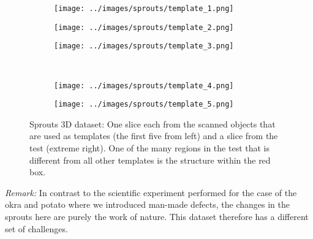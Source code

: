 \documentclass[journal]{IEEEtran}
\begin{document}
\begin{figure}[!h]
    \begin{subfigure}[b]{0.3\linewidth}
        \texttt{[image: ../images/sprouts/template\_1.png]}
\captionsetup{labelformat=empty}
        \caption{}
    \end{subfigure}
\quad
    \begin{subfigure}[b]{0.3\linewidth}
        \texttt{[image: ../images/sprouts/template\_2.png]}
\captionsetup{labelformat=empty}
        \caption{}
     \end{subfigure}
\quad
    \begin{subfigure}[b]{0.3\linewidth}
        \texttt{[image: ../images/sprouts/template\_3.png]}
\captionsetup{labelformat=empty}
        \caption{}
     \end{subfigure}\\
    \begin{subfigure}[b]{0.3\linewidth}
        \texttt{[image: ../images/sprouts/template\_4.png]}
\captionsetup{labelformat=empty}
        \caption{}
     \end{subfigure}
\quad
    \begin{subfigure}[b]{0.3\linewidth}
        \texttt{[image: ../images/sprouts/template\_5.png]}
\captionsetup{labelformat=empty}
        \caption{}
     \end{subfigure}
\quad
    \begin{subfigure}[b]{0.29\linewidth}
\captionsetup{labelformat=empty}
        \caption{}
     \end{subfigure}
      \caption{Sprouts 3D dataset: One slice each from the scanned
        objects that are used as templates (the first five from
        left) and a slice from the test (extreme right). One of the
        many regions in the test that is different from all other
        templates is the structure within the red box.}
\label{fig:object-prior_test_sprouts}
\addtolength{\textfloatsep}{-0.8cm}
\end{figure}

\textit{Remark:} In contrast to the scientific experiment performed
for the case of the okra and potato where we introduced man-made
defects, the changes in the sprouts here are purely the work of
nature. This dataset therefore has a different set of challenges.

\end{document}
